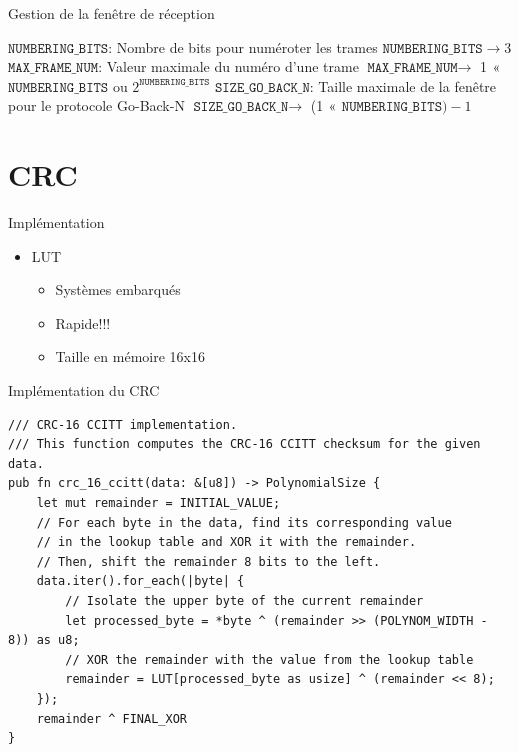 \documentclass{beamer}
\begin{document}
\begin{frame}{Gestion de la fenêtre de réception}
	\begin{outline}
		\1 $\texttt{NUMBERING\_BITS}$: Nombre de bits pour numéroter les trames
		\2[\ding{43}] $\texttt{NUMBERING\_BITS} \rightarrow 3$
		\1 $\texttt{MAX\_FRAME\_NUM}$: Valeur maximale du numéro d'une trame
		\2[\ding{43}] $\texttt{MAX\_FRAME\_NUM} \rightarrow $ 1 $\vcenter{\hbox{<<}}$
		$\texttt{NUMBERING\_BITS}$ ou $2^{\texttt{NUMBERING\_BITS}}$
		\1 $\texttt{SIZE\_GO\_BACK\_N}$: Taille maximale de la fenêtre pour le protocole
		Go-Back-N
		\2[\ding{43}] $\texttt{SIZE\_GO\_BACK\_N} \rightarrow$ (1 $\vcenter{\hbox{<<}}$
		$\texttt{NUMBERING\_BITS}) - 1$
	\end{outline}
\end{frame}

\section{CRC}
\begin{frame}{Implémentation}
	\begin{itemize}
		\item LUT
		      \begin{itemize}
			      \item Systèmes embarqués
			      \item Rapide!!!
			      \item Taille en mémoire 16x16
		      \end{itemize}
	\end{itemize}
\end{frame}


\begin{frame}[fragile]{Implémentation du CRC}

	{\scriptsize
		\begin{verbatim}
/// CRC-16 CCITT implementation.
/// This function computes the CRC-16 CCITT checksum for the given data.
pub fn crc_16_ccitt(data: &[u8]) -> PolynomialSize {
    let mut remainder = INITIAL_VALUE;
    // For each byte in the data, find its corresponding value 
    // in the lookup table and XOR it with the remainder.
    // Then, shift the remainder 8 bits to the left.
    data.iter().for_each(|byte| {
        // Isolate the upper byte of the current remainder
        let processed_byte = *byte ^ (remainder >> (POLYNOM_WIDTH - 8)) as u8;
        // XOR the remainder with the value from the lookup table
        remainder = LUT[processed_byte as usize] ^ (remainder << 8);
    });
    remainder ^ FINAL_XOR
}
\end{verbatim}
	}

\end{frame}
\end{document}
